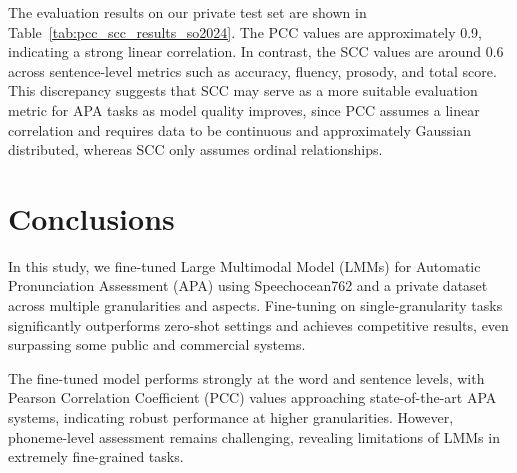 \documentclass{article}
\begin{document}
The evaluation results on our private test set are shown in Table~\ref{tab:pcc_scc_results_so2024}. The PCC values are approximately 0.9, indicating a strong linear correlation. In contrast, the SCC values are around 0.6 across sentence-level metrics such as accuracy, fluency, prosody, and total score. This discrepancy suggests that SCC may serve as a more suitable evaluation metric for APA tasks as model quality improves, since PCC assumes a linear correlation and requires data to be continuous and approximately Gaussian distributed, whereas SCC only assumes ordinal relationships.

\begin{table}[htbp]
\centering
\caption{Evaluation results on the private test set}
\label{tab:pcc_scc_results_so2024}
\end{table}

\section{Conclusions}
\label{sec:typestyle}

In this study, we fine-tuned Large Multimodal Model (LMMs) for Automatic Pronunciation Assessment (APA) using Speechocean762 and a private dataset across multiple granularities and aspects. Fine-tuning on single-granularity tasks significantly outperforms zero-shot settings and achieves competitive results, even surpassing some public and commercial systems.

The fine-tuned model performs strongly at the word and sentence levels, with Pearson Correlation Coefficient (PCC) values approaching state-of-the-art APA systems, indicating robust performance at higher granularities. However, phoneme-level assessment remains challenging, revealing limitations of LMMs in extremely fine-grained tasks.
\end{document}
